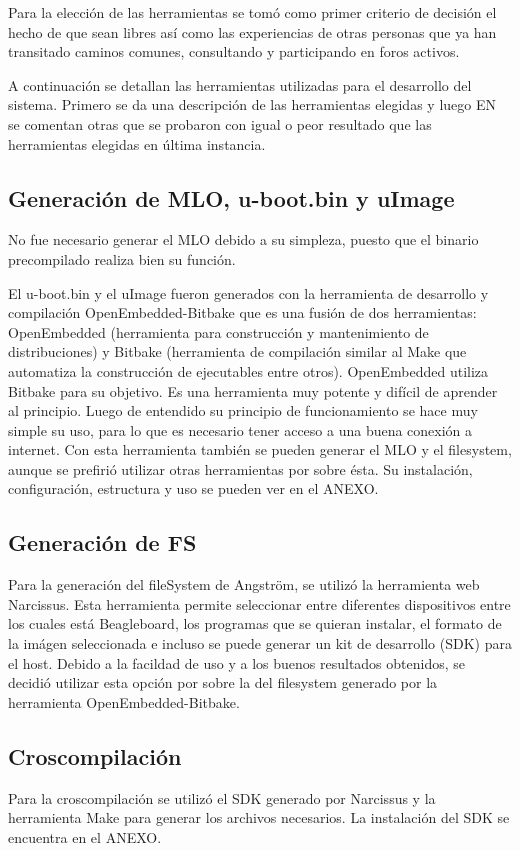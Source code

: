 Para la elección de las herramientas se tomó como primer criterio de decisión el hecho de que sean libres así como las experiencias de otras personas que ya han transitado caminos comunes, consultando y participando en foros activos.

A continuación se detallan las herramientas utilizadas para el desarrollo del sistema. 
Primero se da una descripción de las herramientas elegidas y luego EN se comentan otras que se probaron con igual o peor resultado que las herramientas elegidas en última instancia.

\subsection{Generación de MLO, u-boot.bin y uImage}
No fue necesario generar el MLO debido a su simpleza, puesto que el binario precompilado realiza bien su función.

El u-boot.bin y el uImage fueron generados con la herramienta de desarrollo y compilación OpenEmbedded-Bitbake que es una fusión de dos herramientas: OpenEmbedded (herramienta para construcción y mantenimiento de distribuciones) y Bitbake (herramienta de compilación similar al Make que automatiza la construcción de ejecutables entre otros). OpenEmbedded utiliza Bitbake para su objetivo. Es una herramienta muy potente y difícil de aprender al principio. Luego de entendido su principio de funcionamiento se hace muy simple su uso, para lo que es necesario tener acceso a una buena conexión a internet.
Con esta herramienta también se pueden generar el MLO y el filesystem, aunque se prefirió utilizar otras herramientas por sobre ésta. 
Su instalación, configuración, estructura y uso se pueden ver en el ANEXO. 


\subsection{Generación de FS}
Para la generación del fileSystem de Angström, se utilizó la herramienta web Narcissus.
Esta herramienta permite seleccionar entre diferentes dispositivos entre los cuales está Beagleboard, los programas que se quieran instalar, el formato de la imágen seleccionada e incluso se puede generar un kit de desarrollo (SDK) para el host. Debido a la facildad de uso y a los buenos resultados obtenidos, se decidió utilizar esta opción por sobre la del filesystem generado por la herramienta OpenEmbedded-Bitbake.


\subsection{Croscompilación}
Para la croscompilación se utilizó el SDK generado por Narcissus y la herramienta Make para generar los archivos necesarios. La instalación del SDK se encuentra en el ANEXO.



